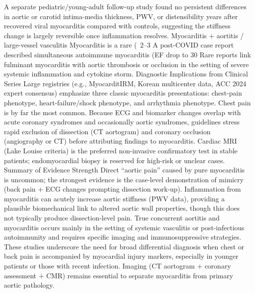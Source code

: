 A separate pediatric/young-adult follow-up study found no persistent differences in aortic or carotid intima-media thickness, PWV, or distensibility years after recovered viral myocarditis compared with controls, suggesting the stiffness change is largely reversible once inflammation resolves.
Myocarditis + aortitis / large-vessel vasculitis  
Myocarditis is a rare (~2–3%
A post-COVID case report described simultaneous autoimmune myocarditis (EF drop to 30%
Rare reports link fulminant myocarditis with aortic thrombosis or occlusion in the setting of severe systemic inflammation and cytokine storm.
Diagnostic Implications from Clinical Series
Large registries (e.g., MyocarditIRM, Korean multicenter data, ACC 2024 expert consensus) emphasize three classic myocarditis presentations: chest-pain phenotype, heart-failure/shock phenotype, and arrhythmia phenotype. Chest pain is by far the most common. Because ECG and biomarker changes overlap with acute coronary syndromes and occasionally aortic syndromes, guidelines stress rapid exclusion of dissection (CT aortogram) and coronary occlusion (angiography or CT) before attributing findings to myocarditis. Cardiac MRI (Lake Louise criteria) is the preferred non-invasive confirmatory test in stable patients; endomyocardial biopsy is reserved for high-risk or unclear cases.
Summary of Evidence Strength
Direct “aortic pain” caused by pure myocarditis is uncommon; the strongest evidence is the case-level demonstration of mimicry (back pain + ECG changes prompting dissection work-up).
Inflammation from myocarditis can acutely increase aortic stiffness (PWV data), providing a plausible biomechanical link to altered aortic wall properties, though this does not typically produce dissection-level pain.
True concurrent aortitis and myocarditis occurs mainly in the setting of systemic vasculitis or post-infectious autoimmunity and requires specific imaging and immunosuppressive strategies.
These studies underscore the need for broad differential diagnosis when chest or back pain is accompanied by myocardial injury markers, especially in younger patients or those with recent infection. Imaging (CT aortogram + coronary assessment + CMR) remains essential to separate myocarditis from primary aortic pathology.
